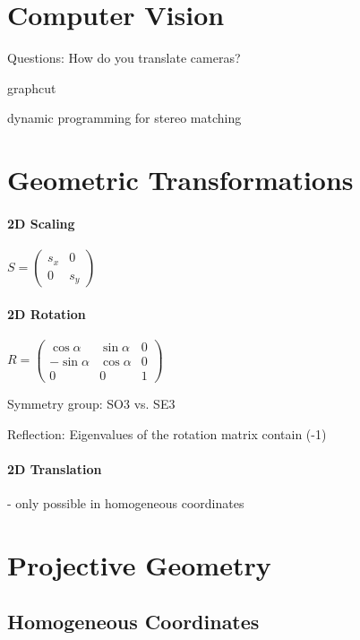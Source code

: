 \section{Computer Vision}

Questions: How do you translate cameras?

graphcut

dynamic programming for stereo matching


\section{Geometric Transformations}

\paragraph{2D Scaling}

$S = \left( \begin{matrix} s_x & 0 \\ 0 & s_y  \end{matrix} \right)$

\paragraph{2D Rotation}

$R = \left(\begin{matrix} \cos  \alpha & \sin \alpha  & 0 \\  -\sin \alpha & \cos \alpha & 0 \\ 0 & 0 & 1  \end{matrix} \right)$

Symmetry group: SO3 vs. SE3

Reflection: Eigenvalues of the rotation matrix contain (-1)

\paragraph{2D Translation} - only possible in homogeneous coordinates

\section{Projective Geometry}

\subsection{Homogeneous Coordinates}

